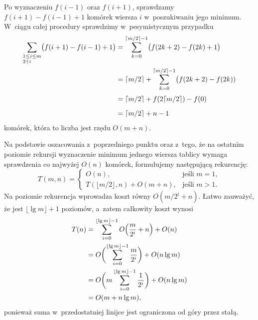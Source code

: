 Po wyznaczeniu $f(i-1)$ oraz $f(i+1)$, sprawdzamy $f(i+1)-f(i-1)+1$ komórek wiersza $i$ w~poszukiwaniu jego minimum. W~ciągu całej procedury sprawdzimy w~pesymistycznym przypadku
\begin{align*}
	\sum_{\begin{subarray}{l}1\le i\le m\\2\,\nmid\,i\end{subarray}}\bigl(f(i+1)-f(i-1)+1\bigr) &= \sum_{k=0}^{\lceil m/2\rceil-1}\bigl(f(2k+2)-f(2k)+1\bigr) \\
	&= \lceil m/2\rceil+\sum_{k=0}^{\lceil m/2\rceil-1}\bigl(f(2k+2)-f(2k)) \\[1mm]
	&= \lceil m/2\rceil+f(2\lceil m/2\rceil)-f(0) \\[2mm]
	&= \lceil m/2\rceil+n-1
\end{align*}
komórek, która to liczba jest rzędu $O(m+n)$.

\subproblem %
Na podstawie oszacowania z~poprzedniego punktu oraz z~tego, że na ostatnim poziomie rekursji wyznaczenie minimum jednego wiersza tablicy wymaga sprawdzenia co najwyżej $O(n)$ komórek, formułujemy następującą rekurencję:
\[
	T(m,n) =
	\begin{cases}
		O(n), & \text{jeśli $m=1$}, \\
		T(\lfloor m/2\rfloor,n)+O(m+n), & \text{jeśli $m>1$}.
	\end{cases}
\]
Na  poziomie rekurencja wprowadza koszt równy $O(m/2^i+n)$. Łatwo zauważyć, że jest $\lfloor\lg m\rfloor+1$ poziomów, a~zatem całkowity koszt wynosi
\begin{align*}
	T(n) &= \sum_{i=0}^{\lfloor\lg m\rfloor-1}O\Bigl(\frac{m}{2^i}+n\Bigr)+O(n) \\
	&= O\biggl(\sum_{i=0}^{\lfloor\lg m\rfloor-1}\frac{m}{2^i}\biggr)+O(n\lg m) \\
	&= O\biggl(m\sum_{i=0}^{\lfloor\lg m\rfloor-1}\frac{1}{2^i}\biggr)+O(n\lg m) \\
	&= O(m+n\lg m),
\end{align*}
ponieważ suma w~przedostatniej linijce jest ograniczona od góry przez stałą.

\endinput
